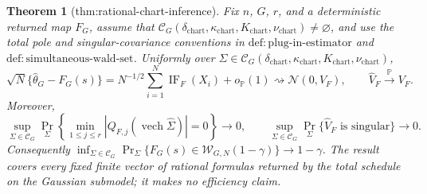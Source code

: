 \documentclass{article}
\newtheorem{theorem}{Theorem}
\begin{document}
\begin{theorem}[thm:rational-chart-inference]\label{thm:rational-chart-inference}
Fix \(n\), \(G\), \(r\), and a deterministic returned map \(F_G\), assume that \(\mathcal C_G(\delta_{\mathrm{chart}},\kappa_{\mathrm{chart}},K_{\mathrm{chart}},\nu_{\mathrm{chart}})\neq\varnothing\), and use the total pole and singular-covariance conventions in \(\mathrm{def:plug\mbox{-}in\mbox{-}estimator}\) and \(\mathrm{def:simultaneous\mbox{-}wald\mbox{-}set}\). Uniformly over \(\Sigma\in\mathcal C_G(\delta_{\mathrm{chart}},\kappa_{\mathrm{chart}},K_{\mathrm{chart}},\nu_{\mathrm{chart}})\),
\[
\sqrt N\{\widehat\theta_G-F_G(s)\}=N^{-1/2}\sum_{i=1}^N\operatorname{IF}_F(X_i)+o_{\mathbb P}(1)\rightsquigarrow\mathcal N(0,V_F),\qquad \widehat V_F\xrightarrow{\mathbb P}V_F.
\]
Moreover,
\[
\sup_{\Sigma\in\mathcal C_G}\Pr_{\Sigma}\!\left\{\min_{1\le j\le r}|Q_{F,j}(\operatorname{vech}\widehat\Sigma)|=0\right\}\to0,\qquad \sup_{\Sigma\in\mathcal C_G}\Pr_{\Sigma}\{\widehat V_F\text{ is singular}\}\to0.
\]
Consequently \(\inf_{\Sigma\in\mathcal C_G}\Pr_{\Sigma}\{F_G(s)\in\mathcal W_{G,N}(1-\gamma)\}\to1-\gamma\). The result covers every fixed finite vector of rational formulas returned by the total schedule on the Gaussian submodel; it makes no efficiency claim.
\end{theorem}
\end{document}
